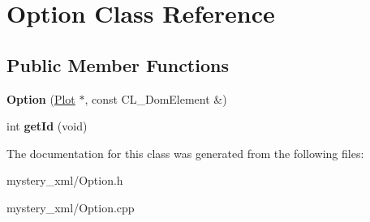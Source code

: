 \hypertarget{classOption}{
\section{Option Class Reference}
\label{classOption}
}
\subsection*{Public Member Functions}
\begin{DoxyCompactItemize}
\item 
\hypertarget{classOption_a3cd7af3fd09c247d01e6725e24a91ea2}{
{\bfseries Option} (\hyperlink{classPlot}{Plot} $\ast$, const CL\_\-DomElement \&)}
\label{classOption_a3cd7af3fd09c247d01e6725e24a91ea2}

\item 
\hypertarget{classOption_aa4598f77bf8564c48e3e7b82cd06ed7f}{
int {\bfseries getId} (void)}
\label{classOption_aa4598f77bf8564c48e3e7b82cd06ed7f}

\end{DoxyCompactItemize}


The documentation for this class was generated from the following files:\begin{DoxyCompactItemize}
\item 
mystery\_\-xml/Option.h\item 
mystery\_\-xml/Option.cpp\end{DoxyCompactItemize}
